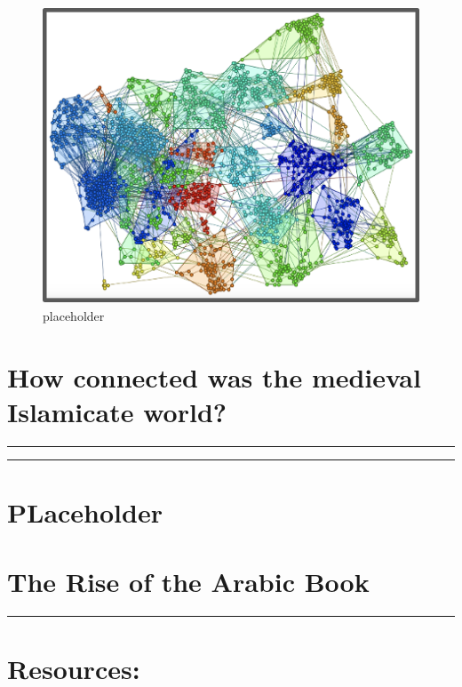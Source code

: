 \documentclass[
]{book}
\begin{document}
\begin{figure}
\centering
\includegraphics{./files/stylo1.png}
\caption{placeholder}
\end{figure}

\hypertarget{how-connected-was-the-medieval-islamicate-world}{%
\section{How connected was the medieval Islamicate world?}\label{how-connected-was-the-medieval-islamicate-world}}

\begin{center}\rule{0.5\linewidth}{0.5pt}\end{center}

\begin{center}\rule{0.5\linewidth}{0.5pt}\end{center}

\hypertarget{placeholder}{%
\section{PLaceholder}\label{placeholder}}

\hypertarget{the-rise-of-the-arabic-book}{%
\section{The Rise of the Arabic Book}\label{the-rise-of-the-arabic-book}}

\begin{center}\rule{0.5\linewidth}{0.5pt}\end{center}

\hypertarget{resources}{%
\section{Resources:}\label{resources}}
\end{document}
